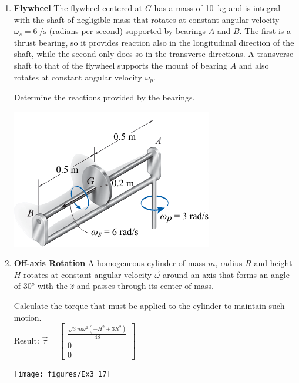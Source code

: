\documentclass[11pt, english, a4paper, twoside]{article}
\begin{document}
\begin{enumerate}
	\item 
	\begin{minipage}[t][4.6cm]{0.55\textwidth}
		\textbf{Flywheel}
		The flywheel centered at \(G\) has a mass of \SI{10}{\kilo\gram} and is integral with the shaft of negligible mass that rotates at constant angular velocity \(\omega_s= \SI{6}{\per\second} \) (radians per second) supported by bearings \(A\) and \(B\).
		The first is a thrust bearing, so it provides reaction also in the longitudinal direction of the shaft, while the second only does so in the transverse directions.
		A transverse shaft to that of the flywheel supports the mount of bearing \(A\) and also rotates at constant angular velocity \(\omega_p\).
		\begin{tasks}
			\task Determine the reactions provided by the bearings.
		\end{tasks}
	\end{minipage}
	\begin{minipage}[c][0.5cm][t]{0.4\textwidth}
		\includegraphics[width=\textwidth]{figures/hibb_21-6}
	\end{minipage}


	\item
	\begin{minipage}[t][3cm]{0.75\textwidth}
		\textbf{Off-axis Rotation}
		A homogeneous cylinder of mass \(m\), radius \(R\) and height \(H\) rotates at constant angular velocity \(\vec{\omega}\) around an axis that forms an angle of \ang{30;;} with the \(\hat{z}\) and passes through its center of mass.
		\begin{tasks}
			\task Calculate the torque that must be applied to the cylinder to maintain such motion.\\
			Result: \(
			\vec{\tau} = \left[\begin{matrix}\frac{\sqrt{3} m \omega^{2} \left(- H^{2} + 3 R^{2}\right)}{48}\\0\\0\end{matrix}\right]
			\) 
		\end{tasks}
	\end{minipage}
	\begin{minipage}[c][2cm][t]{0.2\textwidth}
		\texttt{[image: figures/Ex3\_17]}
	\end{minipage}




\end{enumerate}
\end{document}
